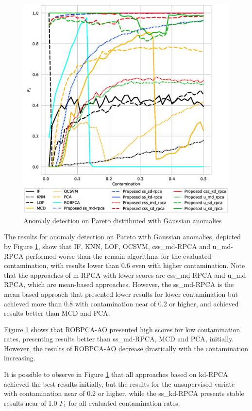 \begin{figure}[h!]
	\centering
	\includegraphics[width=12cm]{figures/ch4/pareto_f1_contamination.eps}
	\caption{Anomaly detection on Pareto distributed with Gaussian anomalies}
	\label{fig:4.11}
\end{figure}

The results for anomaly detection on Pareto with Gaussian anomalies, depicted by Figure \ref{fig:4.11}, show that IF, KNN, LOF, OCSVM, css\_md-RPCA and u\_md-RPCA performed worse than the remain algorithms for the evaluated contamination, with results lower than 0.6 even with higher contamination. Note that the approaches of m-RPCA with lower scores are css\_md-RPCA and u\_md-RPCA, which are mean-based approaches. However, the ss\_md-RPCA is the mean-based approach that presented lower results for lower contamination but achieved more than 0.8 with contamination near of 0.2 or higher, and achieved results better than MCD and PCA.

Figure \ref{fig:4.11} shows that ROBPCA-AO presented high scores for low contamination rates, presenting results better than ss\_md-RPCA, MCD and PCA, initially. However, the results of ROBPCA-AO decrease drastically with the contamination increasing.

It is possible to observe in Figure \ref{fig:4.11} that all approaches based on kd-RPCA achieved the best results initially, but the results for the unsupervised variate with contamination near of 0.2 or higher, while the ss\_kd-RPCA presents stable results near of 1.0 $F_1$ for all evaluated contamination rates.

